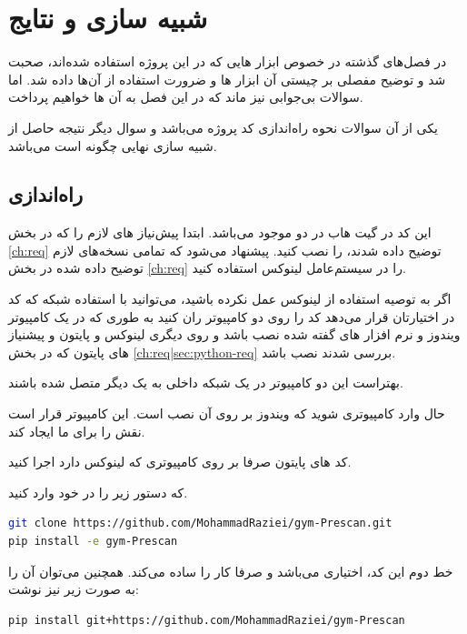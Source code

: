 \chapter{شبیه سازی و نتایج}
در فصل‌های گذشته در خصوص ابزار هایی که در این پروژه استفاده شده‌اند، صحبت شد و توضیح مفصلی بر چیستی آن ابزار ها و ضرورت استفاده از آن‌ها داده شد. اما سوالات بی‌جوابی نیز ماند که در این فصل به آن ها خواهیم پرداخت.

یکی از آن سوالات نحوه راه‌اندازی کد پروژه می‌باشد و سوال دیگر نتیجه حاصل از شبیه سازی نهایی چگونه است می‌باشد.
\section{راه‌اندازی}
این کد در گیت هاب در دو 
موجود می‌باشد. ابتدا پیش‌نیاز های لازم را که در بخش
\ref{ch:req}
توضیح داده شدند، را نصب کنید. پیشنهاد می‌شود که تمامی نسخه‌های لازم توضیح داده شده در بخش \ref{ch:req} را در سیستم‌عامل لینوکس استفاده کنید. 

اگر به توصیه استفاده از لینوکس عمل نکرده باشید، می‌توانید با استفاده شبکه که کد در اختیارتان قرار می‌دهد کد را روی دو کامپیوتر ران کنید به طوری که در یک کامپیوتر ویندوز و نرم افزار های گفته شده نصب باشد و روی دیگری لینوکس و پایتون و پیشنیاز های پایتون که در بخش 
\ref{ch:req|sec:python-req}
بررسی شدند نصب باشد. 
\begin{note}
بهتراست این دو کامپیوتر در یک شبکه داخلی به یک دیگر متصل شده باشند.
\end{note}

حال وارد کامپیوتری شوید که ویندوز بر روی آن نصب است. این کامپیوتر قرار است نقش 
را برای ما ایجاد کند. 
\begin{note}
	کد های پایتون صرفا بر روی کامپیوتری که لینوکس دارد اجرا کنید.
\end{note}
 که دستور زیر را در  خود وارد کنید.

\begin{latin}
\begin{lstlisting}[language=bash]
git clone https://github.com/MohammadRaziei/gym-Prescan.git
pip install -e gym-Prescan
\end{lstlisting}
\end{latin}

خط دوم این کد، اختیاری می‌باشد و صرفا کار را ساده می‌کند. همچنین می‌توان آن را به صورت زیر نیز نوشت:

\begin{latin}
\begin{lstlisting}[language=bash]
pip install git+https://github.com/MohammadRaziei/gym-Prescan
\end{lstlisting}
\end{latin}

